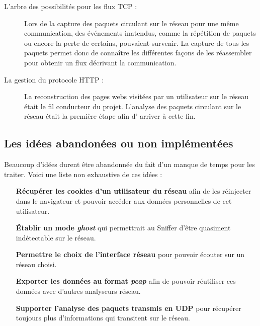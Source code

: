 \begin{description}
\item[L'arbre des possibilités pour les flux TCP :] Lors de la capture des paquets circulant sur le réseau pour une même communication, des événements inatendus, comme la répétition de paquets ou encore la perte de certains,  pouvaient survenir. La capture de tous les paquets permet donc de connaître les différentes façons de les réassembler pour obtenir un flux décrivant la communication. 
\item[La gestion du protocole HTTP :] La reconstruction des pages webs visitées par un utilisateur sur le réseau était le fil conducteur du projet. L'analyse des paquets circulant sur le réseau était la première étape afin d' arriver à cette fin.\\
\end{description}

\subsection{Les idées abandonées ou non implémentées}
Beaucoup d'idées durent être abandonnée du fait d'un manque de temps pour les traiter. Voici une liste non exhaustive de ces idées :\\
\begin{itemize}

  \item[\textbf{Récupérer les cookies d'un utilisateur du réseau}] afin de les réinjecter dans le navigateur et pouvoir accéder aux données personnelles de cet utilisateur.\\
  \item[\textbf{Établir un mode \emph{ghost}}] qui permettrait au Sniffer d'être quasiment indétectable sur le réseau. \\
  \item[\textbf{Permettre le choix de l'interface réseau}] pour pouvoir écouter sur un réseau choisi. \\
  \item[\textbf{Exporter les données au format \emph{pcap}}] afin de pouvoir réutiliser ces données avec d'autres analyseurs réseau.\\
  \item[\textbf{Supporter l'analyse des paquets transmis en UDP}] pour récupérer toujours plus d'informations qui transitent sur le réseau.\\
\end{itemize}
